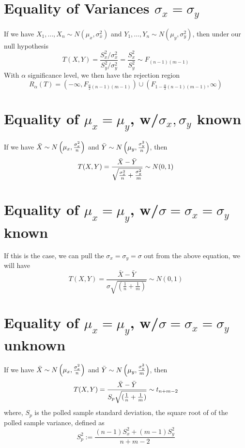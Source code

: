 \documentclass{article}
\begin{document}
\section{Equality of Variances $\sigma_x = \sigma_y$}
If we have $X_1,\ldots,X_n\sim N(\mu_x, \sigma^2_x)$ and $Y_1,\ldots,Y_n\sim 
N(\mu_y, \sigma^2_y)$, then under our null hypothesis
\begin{equation*}
    T(X,Y) = \frac{S_x^2/\sigma_x^2}{S_y^2/\sigma_y^2} = \frac{S_x^2}{S_y^2} \sim F_{(n-1)(m-1)}
\end{equation*}
With $\alpha$ significance level, we then have the rejection region
\begin{equation*}
     R_\alpha(T) = \left(-\infty,F_{\frac{\alpha}{2}(n-1)(m-1)}\right) 
\cup \left(F_{1-\frac{\alpha}{2}(n-1)(m-1)}, \infty\right) 
\end{equation*}

\section{Equality of $\mu_x = \mu_y$, w/$\sigma_x, \sigma_y$ known}
If we have $\Bar{X} \sim N\left( \mu_x, \frac{\sigma_x^2}{n} \right)$ 
and $\Bar{Y} \sim N\left( \mu_y, \frac{\sigma_y^2}{n} \right)$, then 
\begin{equation*}
    T(X,Y) = \frac{\Bar{X} - \Bar{Y}}{\sqrt{\frac{\sigma_x^2}{n} + 
\frac{\sigma_y^2}{m}}}\sim N(0, 1)
\end{equation*}

\section{Equality of $\mu_x = \mu_y$, w/$\sigma=\sigma_x=\sigma_y$ 
known}
If this is the case, we can pull the $\sigma_x = \sigma_y = \sigma$ 
out from the above equation, we will have
\begin{equation*}
    T(X,Y) = \frac{\bar{X} - \bar{Y}}{\sigma \sqrt{(\frac{1}{n} + 
\frac{1}{m})}} \sim N(0, 1)
\end{equation*}

\section{Equality of $\mu_x = \mu_y$, w/$\sigma = \sigma_x = \sigma_y$ 
unknown}
If we have $\Bar{X} \sim N\left( \mu_x, \frac{\sigma_x^2}{n} \right)$ 
and $\Bar{Y} \sim N\left( \mu_y, \frac{\sigma_y^2}{m} \right)$, then 
\begin{equation*}
    T(X,Y) = \frac{\Bar{X} - \Bar{Y}}{S_p \sqrt{(\frac{1}{n} + 
\frac{1}{m})}} \sim t_{n+m-2}
\end{equation*}
where, $S_p$ is the polled sample standard deviation, the square root of 
of the polled sample variance, defined as
\begin{equation*}
    S_p^2 := \frac{(n-1)S_x^2 + (m-1)S_y^2}{n+m-2}
\end{equation*}
\end{document}

